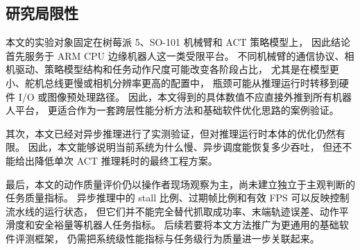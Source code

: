 \subsection{研究局限性}

本文的实验对象固定在树莓派 5、SO-101 机械臂和 ACT 策略模型上，
因此结论首先服务于 ARM CPU 边缘机器人这一类受限平台。
不同机械臂的通信协议、相机驱动、策略模型结构和任务动作尺度可能改变各阶段占比，
尤其是在模型更小、舵机总线更慢或相机分辨率更高的配置中，
瓶颈可能从推理运行时转移到硬件 I/O 或图像预处理路径。
因此，本文得到的具体数值不应直接外推到所有机器人平台，
更适合作为一套跨层性能分析方法和基础软件优化思路的案例验证。

其次，本文已经对异步推理进行了实测验证，但对推理运行时本体的优化仍然有限。
因此，本文能够说明当前系统为什么慢、异步调度能恢复多少吞吐，
但还不能给出降低单次 ACT 推理耗时的最终工程方案。

最后，本文的动作质量评价仍以操作者现场观察为主，尚未建立独立于主观判断的任务质量指标。
异步推理中的 stall 比例、过期帧比例和有效 FPS 可以反映控制流水线的运行状态，
但它们并不能完全替代抓取成功率、末端轨迹误差、动作平滑度和安全裕量等机器人任务指标。
后续若要将本文方法推广为更通用的基础软件评测框架，
仍需把系统级性能指标与任务级行为质量进一步关联起来。
